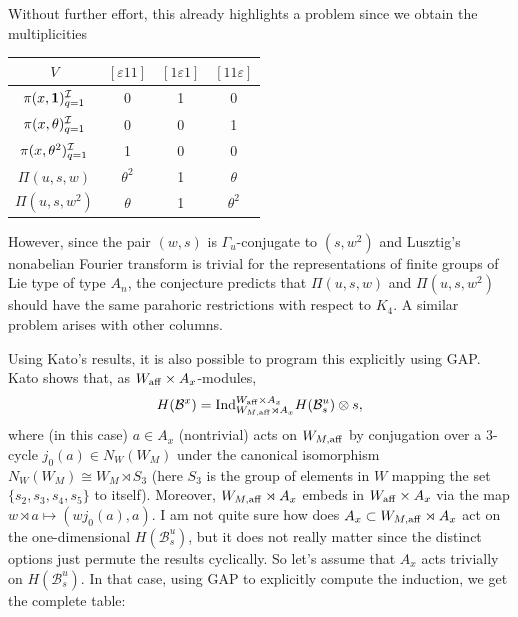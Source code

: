 Without further effort, this already highlights a problem since we obtain the multiplicities

\begin{table}[ht]
    \centering
    \begin{tabular}{|c|ccc|}
        \hline
        $V$ & $[\varepsilon11]$ & $[1\varepsilon1]$ & $[11\varepsilon]$ \\\hline
        $\pi(x,\mathbf{1})^{\mathcal{I}}_{q=1}$ & 0 & 1 & 0  \\
        $\pi(x,\theta)^{\mathcal{I}}_{q=1}$ & 0 & 0 & 1  \\
        $\pi(x,\theta^2)^{\mathcal{I}}_{q=1}$ & 1 & 0 & 0\\\hline
        $\Pi(u,s,w)$ & $\theta^2$ & 1 & $\theta$ \\
        $\Pi(u,s,w^2)$ & $\theta$ & 1 & $\theta^2$ \\\hline
    \end{tabular}
\end{table}
However, since the pair $(w,s)$ is $\Gamma_u$-conjugate to $(s,w^2)$ and Lusztig's nonabelian Fourier transform is trivial for the representations of finite groups of Lie type of type $A_n$, the conjecture predicts that $\Pi(u,s,w)$ and $\Pi(u,s,w^2)$ should have the same parahoric restrictions with respect to $K_4$. A similar problem arises with other columns.

Using Kato's results, it is also possible to program this explicitly using GAP. Kato shows that, as $W_{\mathrm{aff}}\times A_x$-modules,
$$H(\mathcal{B}^x)=\mathrm{Ind}_{W_{M,\mathrm{aff}}\rtimes A_x}^{W_{\mathrm{aff}}\times A_x}H(\mathcal{B}^u_s)\otimes s,$$
where (in this case) $a\in A_x$ (nontrivial) acts on $W_{M,\mathrm{aff}}$ by conjugation over a $3$-cycle $j_0(a)\in N_W(W_M)$ under the canonical isomorphism $N_W(W_M)\cong W_M\rtimes S_3$ (here $S_3$ is the group of elements in $W$ mapping the set $\{s_2,s_3,s_4,s_5\}$ to itself). Moreover, $W_{M,\mathrm{aff}}\rtimes A_x$ embeds in $W_{\mathrm{aff}}\times A_x$ via the map $w\rtimes a\mapsto (wj_0(a),a)$. I am not quite sure how does $A_x\subset W_{M,\mathrm{aff}}\rtimes A_x$ act on the one-dimensional $H(\mathcal{B}^u_s)$, but it does not really matter since the distinct options just permute the results cyclically. So let's assume that $A_x$ acts trivially on $H(\mathcal{B}^u_s)$. In that case, using GAP to explicitly compute the induction, we get the complete table:

